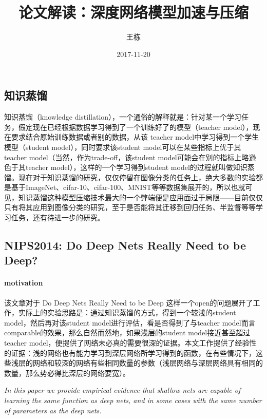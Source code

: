 \documentclass[11pt]{article} %
\title{论文解读：深度网络模型加速与压缩}
\author{王栋}
\date{2017-11-20}
\begin{document}
\begin{CJK}{UTF8}{gkai}
\maketitle

\section{知识蒸馏}
知识蒸馏（knowledge distillation），一个通俗的解释就是：针对某一个学习任务，假定现在已经根据数据学习得到了一个训练好了的模型（teacher model），现在要求结合原始训练数据或者别的数据，从该 teacher model中学习得到一个学生模型（student model），同时要求该student model可以在某些指标上优于其teacher model（当然，作为trade-off，该student model可能会在别的指标上略逊色于其teacher model），这样的一个学习得到student model的过程就叫做知识蒸馏。现在对于知识蒸馏的研究，仅仅停留在图像分类的任务上，绝大多数的实验都是基于ImageNet、cifar-10、cifar-100、MNIST等等数据集展开的，所以也就可见，知识蒸馏这种模型压缩技术最大的一个弊端便是应用面过于局限——目前仅仅只有将其应用到图像分类的研究，至于是否能将其迁移到回归任务、半监督等等学习任务，还有待进一步的研究。

\subsection{NIPS2014: Do Deep Nets Really Need to be Deep?}
\paragraph{motivation}
该文章对于 Do Deep Nets Really Need to be Deep 这样一个open的问题展开了工作，实际上的实验思路是：通过知识蒸馏的方式，得到一个较浅的student model，然后再对该student model进行评估，看是否得到了与teacher model而言comparable的效果，那么自然而然地，如果浅层的student model接近甚至超过teacher model，便提供了网络未必真的需要很深的证据。本文工作提供了经验性的证据：浅的网络也有能力学习到深层网络所学习得到的函数，在有些情况下，这些浅层的网络和较深的网络有些相同数量的参数（浅层网络与深层网络具有相同的数量，那么势必得比深层的网络要宽）。\par \emph{In this paper we provide empirical evidence that shallow nets are capable of learning the same function as deep nets, and in some cases with the same number of parameters as the deep nets. }


\end{CJK}
\end{document}
